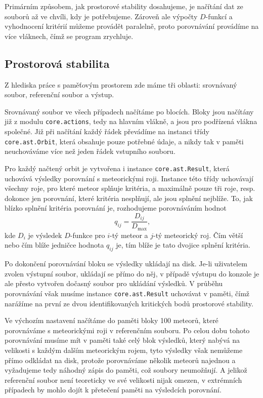 \smallskip

Primárním způsobem, jak prostorové stability dosahujeme, je načítání dat ze souborů až ve chvíli, kdy je potřebujeme. Zároveň ale výpočty $D$-funkcí a vyhodnocení kritérií můžeme provádět paralelně, proto porovnávání provádíme na více vláknech, čímž se program zrychluje.

\subsection{Prostorová stabilita}%
Z hlediska práce s paměťovým prostorem zde máme tři oblasti: srovnávaný soubor, referenční soubor a výstup.

\medskip

Srovnávaný soubor ve všech případech načítáme po blocích. Bloky jsou načítány již z modulu \texttt{core.actions}, tedy na hlavním vlákně, a jsou pro podřízená vlákna společné. Již při načítání každý řádek převádíme na instanci třídy \texttt{core.ast.Orbit}, která obsahuje pouze potřebné údaje, a nikdy tak v paměti neuchováváme více než jeden řádek vstupního souboru.

Pro každý načtený orbit je vytvořena i instance \texttt{core.ast.Result}, která uchovává výsledky porovnání s meteorickými roji. Instance této třídy uchovávají všechny roje, pro které meteor splňuje kritéria, a maximálně pouze tři roje, resp. dokonce jen porovnání, které kritéria nesplňují, ale jsou splnění nejblíže. To, jak blízko splnění kritéria porovnání je, rozhodujeme porovnáváním hodnot
\begin{equation}
    q_{ij}=\frac{D_{ij}}{D_\text{max}}\text{,}
\end{equation}
kde $D_i$ je výsledek $D$-funkce pro $i$-tý meteor a $j$-tý meteorický roj. Čím větší nebo čím blíže jedničce hodnota $q_{ij}$ je, tím blíže je tato dvojice splnění kritéria.

Po dokončení porovnávání bloku se výsledky ukládají na disk. Je-li uživatelem zvolen výstupní soubor, ukládají se přímo do něj, v případě výstupu do konzole je ale přesto vytvořen dočasný soubor pro ukládání výsledků. V průběhu porovnávání však musíme instance \texttt{core.ast.Result} uchovávat v paměti, čímž narážíme na první ze dvou identifikovaných kritických bodů prostorové stability.

\smallskip

Ve výchozím nastavení načítáme do paměti bloky 100 meteorů, které porovnáváme s meteorickými roji v referenčním souboru. Po celou dobu tohoto porovnávání musíme mít v paměti také celý blok výsledků, který nabývá na velikosti s každým dalším meteorickým rojem, tyto výsledky však nemůžeme přímo odkládat na disk, protože porovnáváme několik meteorů najednou a vyžadujeme tedy náhodný zápis do paměti, což soubory neumožňují. A jelikož referenční soubor není teoreticky ve své velikosti nijak omezen, v extrémních případech by mohlo dojít k přetečení paměti na výsledcích porovnání.

